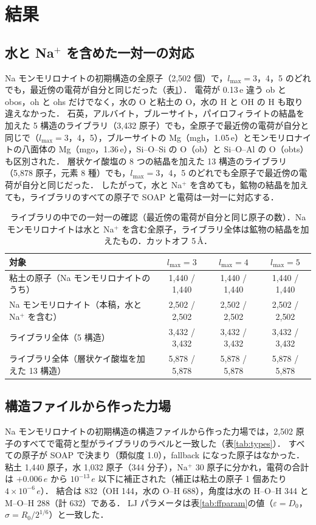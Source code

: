 \documentclass[a4paper,11pt]{article}
\newcommand{\e}{\,e}
\begin{document}
\section{結果}
\subsection{水と Na$^+$ を含めた一対一の対応}
Na モンモリロナイトの初期構造の全原子（2{,}502 個）で，$l_{\max}=3$，4，5 のどれでも，最近傍の電荷が自分と同じだった（表\ref{tab:loo}）．
電荷が 0.13\e{} 違う ob と obos，oh と ohs だけでなく，水の O と粘土の O，水の H と OH の H も取り違えなかった．
石英，アルバイト，ブルーサイト，パイロフィライトの結晶を加えた 5 構造のライブラリ（3{,}432 原子）でも，全原子で最近傍の電荷が自分と同じで（$l_{\max}=3$，4，5），ブルーサイトの Mg（mgh，1.05\e）とモンモリロナイトの八面体の Mg（mgo，1.36\e），Si--O--Si の O（ob）と Si--O--Al の O（obts）も区別された．
層状ケイ酸塩の 8 つの結晶を加えた 13 構造のライブラリ（5{,}878 原子，元素 8 種）でも，$l_{\max}=3$，4，5 のどれでも全原子で最近傍の電荷が自分と同じだった．
したがって，水と Na$^+$ を含めても，鉱物の結晶を加えても，ライブラリのすべての原子で SOAP と電荷は一対一に対応する．

\begin{table}[!htbp]
\centering
\caption{ライブラリの中での一対一の確認（最近傍の電荷が自分と同じ原子の数）．Na モンモリロナイトは水と Na$^+$ を含む全原子，ライブラリ全体は鉱物の結晶を加えたもの．カットオフ 5\,\AA．}
\label{tab:loo}
\small
\begin{tabular}{lccc}
\toprule
対象 & $l_{\max}=3$ & $l_{\max}=4$ & $l_{\max}=5$ \\
\midrule
粘土の原子（Na モンモリロナイトのうち） & 1{,}440 / 1{,}440 & 1{,}440 / 1{,}440 & 1{,}440 / 1{,}440 \\
Na モンモリロナイト（本稿，水と Na$^+$ を含む） & 2{,}502 / 2{,}502 & 2{,}502 / 2{,}502 & 2{,}502 / 2{,}502 \\
ライブラリ全体（5 構造） & 3{,}432 / 3{,}432 & 3{,}432 / 3{,}432 & 3{,}432 / 3{,}432 \\
ライブラリ全体（層状ケイ酸塩を加えた 13 構造） & 5{,}878 / 5{,}878 & 5{,}878 / 5{,}878 & 5{,}878 / 5{,}878 \\
\bottomrule
\end{tabular}
\end{table}

\subsection{構造ファイルから作った力場}
\label{sec:resmont}
Na モンモリロナイトの初期構造の構造ファイルから作った力場では，2{,}502 原子のすべてで電荷と型がライブラリのラベルと一致した（表\ref{tab:types}）．
すべての原子が SOAP で決まり（類似度 1.0），fallback になった原子はなかった．
粘土 1{,}440 原子，水 1{,}032 原子（344 分子），Na$^+$ 30 原子に分かれ，電荷の合計は $+0.006\e$ から $10^{-13}\e$ 以下に補正された（補正は粘土の原子 1 個あたり $4\times10^{-6}\e$）．
結合は 832（OH 144，水の O--H 688），角度は水の H--O--H 344 と M--O--H 288（計 632）である．
LJ パラメータは表\ref{tab:ffparam}の値（$\varepsilon=D_0$，$\sigma=R_0/2^{1/6}$）と一致した．
\end{document}
